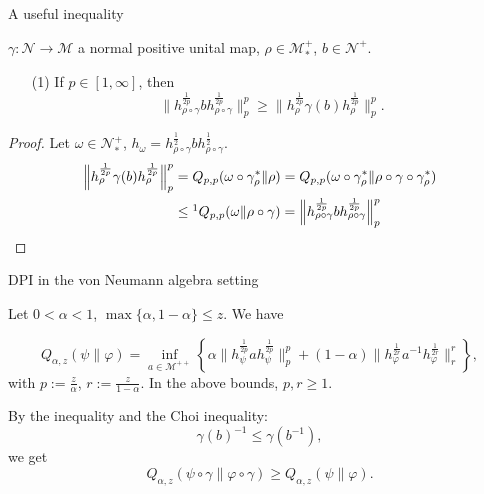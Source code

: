 \documentclass[mathserif]{beamer}
\newcommand{\<}{\langle}
\renewcommand{\>}{\rangle}
\newcommand{\Me}{\mathcal M}
\newcommand{\Ne}{\mathcal N}
\begin{document}
\begin{frame}{A useful inequality}

 $\gamma:\Ne\to \Me$  a normal positive unital map,  $\rho\in \Me_*^+$,  $b\in \Ne^+$. 

\bigskip
\begin{enumerate}
\item[(1)] If $p\in [1,\infty]$, then 
\[
\Big\|h_{\rho\circ\gamma}^{\frac{1}{2p}}bh_{\rho\circ\gamma}^{\frac{1}{2p}}\Big\|^p_p\ge
\Big\|h_{\rho}^{\frac{1}{2p}}\gamma(b)h_{\rho}^{\frac{1}{2p}}\Big\|^p_p.
\]
\end{enumerate}

\begin{proof} Let $\omega\in \Ne_*^+$,
$h_\omega=h_{\rho\circ\gamma}^{\frac12}bh_{\rho\circ\gamma}^{\frac12}$.
\begin{align*}
\Big\|h_{\rho}^{\frac{1}{2p}}\gamma(b)h_{\rho}^{\frac{1}{2p}}\Big\|^p_p&=Q_{p,p}(\omega\circ
\gamma^*_\rho\|\rho)=Q_{p,p}(\omega\circ
\gamma^*_\rho\|\rho\circ\gamma\circ\gamma_\rho^*)\\
&\le\footnotemark 
Q_{p,p}(\omega\|\rho\circ\gamma)=\Big\|h_{\rho\circ\gamma}^{\frac{1}{2p}}bh_{\rho\circ\gamma}^{\frac{1}{2p}}\Big\|^p_p
\end{align*}



\end{proof}

\end{frame}

\begin{frame}{DPI in the von Neumann algebra setting}

Let $0<\alpha<1$, $\max\{\alpha,1-\alpha\}\le z$.  We have

\medskip 

\[
Q_{\alpha,z}(\psi\|\varphi)=\inf_{a\in \Me^{++}}\left\{\alpha
\Big\|h_\psi^{\frac{1}{2p}}ah_\psi^{\frac{1}{2p}}\Big\|_p^{p}
+(1-\alpha) \Big\|h_\varphi^{\frac{1}{2r}}a^{-1}h_\varphi^{\frac{1}{2r}}\Big\|_r^{r}
\right\},
\]
with $p:=\frac{z}{\alpha}$, $r:=\frac{z}{1-\alpha}$. In the above bounds, $p,r\ge 1$.

\bigskip

By the inequality  and the Choi inequality:
\[
\gamma(b)^{-1}\le \gamma(b^{-1}),
\]
we get
\[
Q_{\alpha,z}(\psi\circ\gamma\|\varphi\circ\gamma)\ge Q_{\alpha,z}(\psi\|\varphi).
\]


\end{frame}
\end{document}
